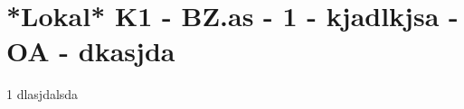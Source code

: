 \section{*Lokal* K1 - BZ.as - 1 - kjadlkjsa - OA - dkasjda}

\begin{langesbeispiel} \item[1] %
dlasjdalsda
\end{langesbeispiel}